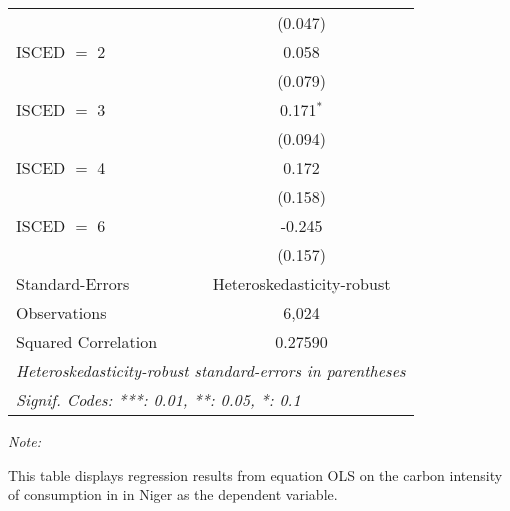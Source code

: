 \begin{table}[htbp!]
\begin{adjustbox}{width = 1\textwidth, max height = 0.95\textheight, center}
\begin{threeparttable}[b]
\begin{tabular}{lc}
                                & (0.047)\\   
            ISCED $=$ 2         & 0.058\\   
                                & (0.079)\\   
            ISCED $=$ 3         & 0.171$^{*}$\\   
                                & (0.094)\\   
            ISCED $=$ 4         & 0.172\\   
                                & (0.158)\\   
            ISCED $=$ 6         & -0.245\\   
                                & (0.157)\\   
            \midrule 
            Standard-Errors     & Heteroskedasticity-robust \\   
            Observations        & 6,024\\  
            Squared Correlation & 0.27590\\  
            \midrule \midrule
            \multicolumn{2}{l}{\emph{Heteroskedasticity-robust standard-errors in parentheses}}\\
            \multicolumn{2}{l}{\emph{Signif. Codes: ***: 0.01, **: 0.05, *: 0.1}}\\
         \end{tabular}
         
         \begin{tablenotes}\item \medskip \textit{Note:}
            \item This table displays regression results from equation OLS on the carbon intensity of consumption in  in Niger as the dependent variable. 
         \end{tablenotes}
      \end{threeparttable}
   \end{adjustbox}
\end{table}


